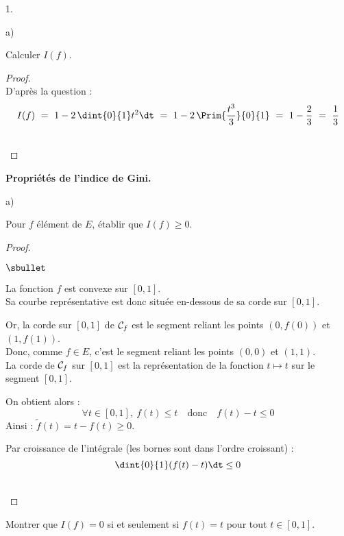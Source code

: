 \documentclass[11pt]{article}%
\begin{document}
\begin{noliste}{1.}
\begin{noliste}{a)}
  
  \item Calculer $I(f)$. 
  
  \begin{proof}~\\
    D'après la question  :
    \[
      I(f) \ = \ 1-2 \, \dint{0}{1} t^2\dt \ = \ 1- 2 \, 
      \Prim{\dfrac{t^3}{3}}
      {0}{1} \ = \ 1-\dfrac{2}{3} \ = \ \dfrac{1}{3}
    \]
    
    ~\\[-1.4cm]
  \end{proof}
 \end{noliste}
 
 \item \textbf{Propriétés de l'indice de Gini.}
 \begin{noliste}{a)}
  \item Pour $f$ élément de $E$, établir que $I(f) \geq 0$. 
  
  \begin{proof}~
    \begin{noliste}{$\sbullet$}
	\item La fonction $f$ est convexe sur $[0,1]$.\\ 
	Sa courbe 
	représentative est donc située en-dessous de sa corde sur 
	$[0,1]$.
	\item Or, la corde sur $[0,1]$ de ${\cal C}_f$ est le segment 
	reliant
	les points $(0,f(0))$ et $(1,f(1))$.\\
	Donc, comme $f\in E$, c'est le segment reliant les points 
	$(0,0)$ et $(1,1)$.\\
	La corde de ${\cal C}_f$ sur $[0,1]$ est la représentation de 
	la fonction
	$t\mapsto t$ sur le segment $[0,1]$.
	
	
	
	
	\item On obtient alors :
	\[
	  \forall t\in [0,1], \ f(t) \leq t \quad \text{donc} \quad 
	  f(t) -t \leq 0
	\]
	Ainsi : $\tilde{f}(t) = t-f(t) \geq 0$.
	\item Par croissance de l'intégrale (les bornes sont dans 
	l'ordre croissant) :
	\[
	  \dint{0}{1} (f(t)-t) \dt \leq 0
	\]
      \end{noliste}
    
    ~\\[-1.4cm]
  \end{proof}

  
  \item Montrer que $I(f) =0$ si et seulement si $f(t)=t$ pour tout $t 
  \in [0,1]$. 
  

\end{noliste}
\end{noliste}
\end{document}
